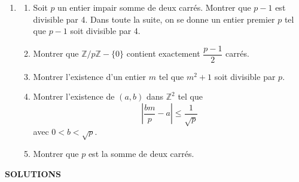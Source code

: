 \begin{enumerate}[label=\arabic*.,leftmargin=2.2em,itemsep=1.1em]
\item
\begin{enumerate}[label=\alph*),leftmargin=2em]
\item Soit $p$ un entier impair somme de deux carrés. Montrer que $p-1$ est divisible par 4. Dans toute la suite, on se donne un entier premier $p$ tel que $p-1$ soit divisible par 4.
\item Montrer que $\mathbb Z/p\mathbb Z-\{0\}$ contient exactement $\dfrac{p-1}{2}$ carrés.
\item Montrer l'existence d'un entier $m$ tel que $m^2+1$ soit divisible par $p$.
\item Montrer l'existence de $(a,b)$ dans $\mathbb Z^2$ tel que
\[
\left|\frac{bm}{p}-a\right|\le\frac1{\sqrt p}
\]
avec $0<b<\sqrt p$.
\item Montrer que $p$ est la somme de deux carrés.
\end{enumerate}

\end{enumerate}

\begin{center}
{\Large\sffamily\bfseries\color{BellaLavenderDeep} SOLUTIONS}
\end{center}
\vspace{0.8em}

